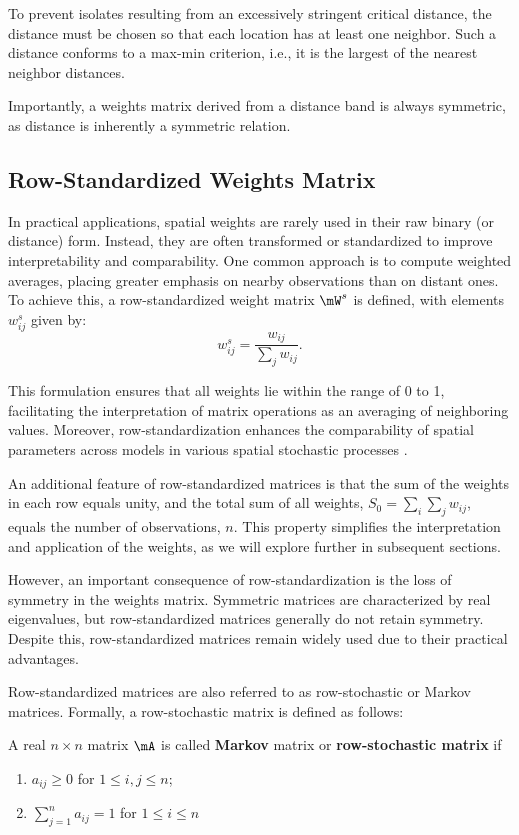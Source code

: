 \documentclass[english,12pt]{book}\usepackage[]{graphicx}\usepackage[]{xcolor}
\begin{document}
To prevent isolates resulting from an excessively stringent critical distance, the distance must be chosen so that each location has at least one neighbor. Such a distance conforms to a max-min criterion, i.e., it is the largest of the nearest neighbor distances.

Importantly, a weights matrix derived from a distance band is always symmetric, as distance is inherently a symmetric relation.

\subsection{Row-Standardized Weights Matrix}

In practical applications, spatial weights are rarely used in their raw binary (or distance) form. Instead, they are often transformed or standardized to improve interpretability and comparability. One common approach is to compute weighted averages, placing greater emphasis on nearby observations than on distant ones. To achieve this, a row-standardized weight matrix $\mW^s$ is defined, with elements $w_{ij}^s$ given by:
\begin{equation*}
w_{ij}^s = \frac{w_{ij}}{\sum_j w_{ij}}.
\end{equation*}

This formulation ensures that all weights lie within the range of 0 to 1, facilitating the interpretation of matrix operations as an averaging of neighboring values. Moreover, row-standardization enhances the comparability of spatial parameters across models in various spatial stochastic processes \citep{AnselinBera1998}.

An additional feature of row-standardized matrices is that the sum of the weights in each row equals unity, and the total sum of all weights, $S_0 = \sum_i\sum_j w_{ij}$, equals the number of observations, $n$. This property simplifies the interpretation and application of the weights, as we will explore further in subsequent sections.

However, an important consequence of row-standardization is the loss of symmetry in the weights matrix. Symmetric matrices are characterized by real eigenvalues, but row-standardized matrices generally do not retain symmetry. Despite this, row-standardized matrices remain widely used due to their practical advantages.

Row-standardized matrices are also referred to as row-stochastic or Markov matrices. Formally, a row-stochastic matrix is defined as follows:
\begin{definition}
	A real $n\times n$ matrix $\mA$ is called \textbf{Markov} matrix or \textbf{row-stochastic matrix} if 
		\begin{enumerate}
			\item $a_{ij} \geq 0$ for $1\leq i, j \leq n$;
			\item $\sum_{j=1}^n a_{ij} = 1$ for $1\leq i \leq n$
		\end{enumerate}
\end{definition}
\end{document}
